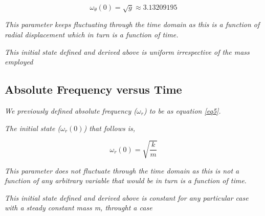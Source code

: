                 $$\omega_\theta(0) = \sqrt{g} \approx 3.13209195$$
                
                \textit{This parameter keeps fluctuating through the time domain as this is a function of radial displacement which in turn is a function of time.}
                
                \textit{This initial state defined and derived above is uniform irrespective of the mass employed}
                
    
    \subsection{{Absolute Frequency versus Time}}
                
                \textit{We previously defined absolute frequency ($\omega_r$) to be as equation \ref{eq5}.}
                
                \textit{The initial state ($\omega_r(0)$) that follows is,}
                
                $$\omega_r(0) = \sqrt{\frac{k}{m}}$$
                
                \textit{This parameter does not fluctuate through the time domain as this is not a function of any arbitrary variable that would be in turn is a function of time.}
                
                \textit{This initial state defined and derived above is constant for any particular case with a steady constant mass m, throught a case}
            
            


